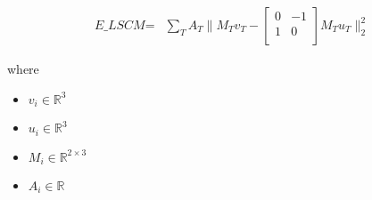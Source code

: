 \documentclass[12pt]{article}
\begin{document}
\begin{align*}
\textit{E\_LSCM} = & \sum_\textit{T} \textit{A}_{ \textit{T} }\|\textit{M}_{ \textit{T} }\textit{v}_{ \textit{T} } - \begin{bmatrix}
0 & -1\\
1 & 0\\
\end{bmatrix}\textit{M}_{ \textit{T} }\textit{u}_{ \textit{T} }\|_2^{2}
\end{align*}

where
\begin{itemize}
\item $\textit{v}_{\textit{i}} \in \mathbb{R}^{ 3}$
\item $\textit{u}_{\textit{i}} \in \mathbb{R}^{ 3}$
\item $\textit{M}_{\textit{i}} \in \mathbb{R}^{ 2 \times 3 }$
\item $\textit{A}_{\textit{i}} \in \mathbb{{R}}$
\end{itemize}
\end{document}
